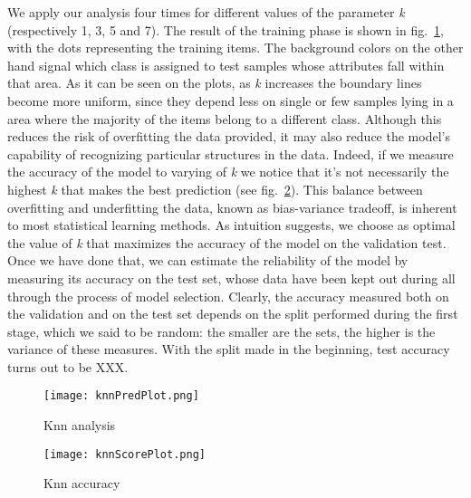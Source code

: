\documentclass[11pt,twoside,a4paper]{article}
\begin{document}
We apply our analysis four times for different values of the parameter \emph{k} (respectively 1, 3, 5 and 7). The result of the training phase is shown in fig.~\ref{fig:knnPred}, with the dots representing the training items. The background colors on the other hand signal which class is assigned to test samples whose attributes fall within that area. As it can be seen on the plots, as \emph{k} increases the boundary lines become more uniform, since they depend less on single or few samples lying in a area where the majority of the items belong to a different class. Although this reduces the risk of overfitting the data provided, it may also reduce the model's capability of recognizing particular structures in the data.
Indeed, if we measure the accuracy of the model to varying of \emph{k} we notice that it's not necessarily the highest \emph{k} that makes the best prediction (see fig.~\ref{fig:knnScore}). This balance between overfitting and underfitting the data, known as bias-variance tradeoff, is inherent to most statistical learning methods.\newline
As intuition suggests, we choose as optimal the value of \emph{k} that maximizes the accuracy of the model on the validation test. Once we have done that, we can estimate the reliability of the model by measuring its accuracy on the test set, whose data have been kept out during all through the process of model selection. Clearly, the accuracy measured both on the validation and on the test set depends on the split performed during the first stage, which we said to be random: the smaller are the sets, the higher is the variance of these measures. With the split made in the beginning, test accuracy turns out to be XXX.

\begin{figure}[]
  \begin{center}
  \texttt{[image: knnPredPlot.png]}
  \caption{Knn analysis}
  \label{fig:knnPred}
  \end{center}
\end{figure}

\begin{figure}[]
  \begin{center}
  \texttt{[image: knnScorePlot.png]}
  \caption{Knn accuracy}
  \label{fig:knnScore}
  \end{center}
\end{figure}
\end{document}
